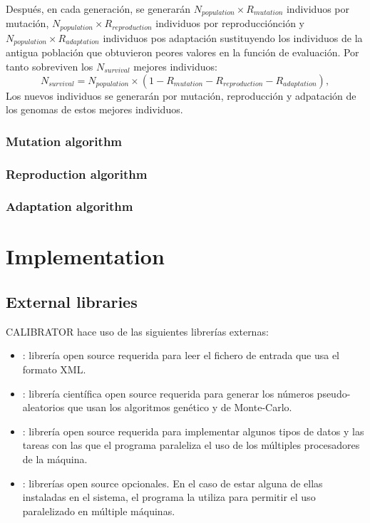 \documentclass[review,authoryear]{elsarticle}
\newcommand{\EQ}[2]
{\begin{equation}#1\end{equation}\label{#2}}
\begin{document}
Después, en cada generación, se generarán $N_{population}\times R_{mutation}$
individuos por mutación, $N_{population}\times R_{reproduction}$ individuos
por reproducciónción y $N_{population}\times R_{adaptation}$ individuos
pos adaptación sustituyendo los individuos de la antigua población que
obtuvieron peores valores en la función de evaluación. Por tanto sobreviven los
$N_{survival}$ mejores individuos:
\EQ
{
	N_{survival}=N_{population}\times
	\left(1-R_{mutation}-R_{reproduction}-R_{adaptation}\right),
}{EqSurvival}
Los nuevos individuos se generarán por mutación, reproducción y adpatación de
los genomas de estos mejores individuos.

\subsubsection{Mutation algorithm}

\subsubsection{Reproduction algorithm}

\subsubsection{Adaptation algorithm}

\section{Implementation}

\subsection{External libraries}

CALIBRATOR hace uso de las siguientes librerías externas:

\begin{itemize}
\item\cite{libxml}: librería open source requerida para leer el fichero
	de entrada que usa el formato XML.
\item\cite{gsl}: librería científica open source requerida para generar
	los números pseudo-aleatorios que usan los algoritmos genético y de
	Monte-Carlo.
\item\cite{glib}: librería open source requerida para implementar algunos
	tipos de datos y las tareas con las que el programa paraleliza el uso de los
	múltiples procesadores de la máquina.
\item\cite{openmpi,mpich}: librerías open source opcionales. En
	el caso de estar alguna de ellas instaladas en el sistema, el programa la
	utiliza para permitir el uso paralelizado en múltiple máquinas.
\end{itemize}
\end{document}
